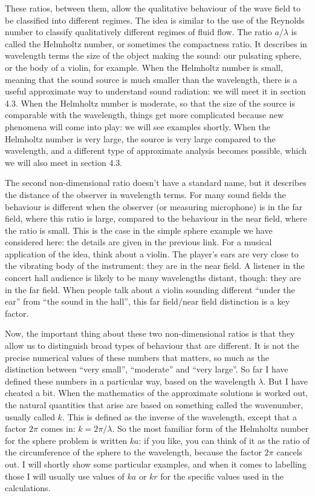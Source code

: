   These ratios, between them, allow the qualitative behaviour of the wave field 
  to be classified into different regimes. The idea is similar to the use of 
  the Reynolds number to classify qualitatively different regimes of fluid 
  flow. The ratio $a/\lambda$ is called the Helmholtz number, or sometimes the 
  compactness ratio. It describes in wavelength terms the size of the object 
  making the sound: our pulsating sphere, or the body of a violin, for example. 
  When the Helmholtz number is small, meaning that the sound source is much 
  smaller than the wavelength, there is a useful approximate way to understand 
  sound radiation: we will meet it in section 4.3. When the Helmholtz number is 
  moderate, so that the size of the source is comparable with the wavelength, 
  things get more complicated because new phenomena will come into play: we 
  will see examples shortly. When the Helmholtz number is very large, the 
  source is very large compared to the wavelength, and a different type of 
  approximate analysis becomes possible, which we will also meet in section 
  4.3. 

  The second non-dimensional ratio doesn't have a standard name, but it 
  describes the distance of the observer in wavelength terms. For many sound 
  fields the behaviour is different when the observer (or measuring microphone) 
  is in the far field, where this ratio is large, compared to the behaviour in 
  the near field, where the ratio is small. This is the case in the simple 
  sphere example we have considered here: the details are given in the previous 
  link. For a musical application of the idea, think about a violin. The 
  player's ears are very close to the vibrating body of the instrument: they 
  are in the near field. A listener in the concert hall audience is likely to 
  be many wavelengths distant, though: they are in the far field. When people 
  talk about a violin sounding different ``under the ear'' from ``the sound in 
  the hall'', this far field/near field distinction is a key factor. 

  Now, the important thing about these two non-dimensional ratios is that they 
  allow us to distinguish broad types of behaviour that are different. It is 
  not the precise numerical values of these numbers that matters, so much as 
  the distinction between ``very small'', ``moderate'' and ``very large''. So 
  far I have defined these numbers in a particular way, based on the wavelength 
  $\lambda$. But I have cheated a bit. When the mathematics of the approximate 
  solutions is worked out, the natural quantities that arise are based on 
  something called the wavenumber, usually called $k$. This is defined as the 
  inverse of the wavelength, except that a factor $2 \pi$ comes in: $k=2 \pi / 
  \lambda$. So the most familiar form of the Helmholtz number for the sphere 
  problem is written $ka$: if you like, you can think of it as the ratio of the 
  circumference of the sphere to the wavelength, because the factor $2 \pi$ 
  cancels out. I will shortly show some particular examples, and when it comes 
  to labelling those I will usually use values of $ka$ or $kr$ for the specific 
  values used in the calculations. 

